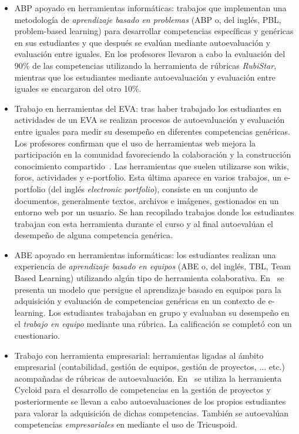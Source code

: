 \begin{itemize}
\item ABP apoyado en herramientas informáticas: trabajos que implementan una metodología de \emph{aprendizaje basado en problemas} (ABP o, del inglés, PBL, problem-based learning) para desarrollar competencias específicas y genéricas en sus estudiantes y que después se evalúan mediante autoevaluación y evaluación entre iguales. En \cite{lasa2013problem} los profesores llevaron a cabo la evaluación del 90\% de las competencias utilizando la herramienta de rúbricas \emph{RubiStar}, mientras que los estudiantes mediante autoevaluación y evaluación entre iguales se encargaron del otro 10\%. 
\item Trabajo en herramientas del EVA:  tras haber trabajado los estudiantes en actividades de un EVA se realizan procesos de autoevaluación y evaluación entre iguales para medir su desempeño en diferentes competencias genéricas. Los profesores confirman que el uso de herramientas web mejora la participación en la comunidad favoreciendo la colaboración y la construcción conocimiento compartido~\cite{starcic2008sustaining}. Las herramientas que suelen utilizarse son wikis, foros, actividades y e-portfolio. Esta última aparece en varios trabajos, un e-portfolio (del inglés \emph{electronic portfolio}), consiste en un conjunto de documentos, generalmente textos, archivos e imágenes, gestionados en un entorno web por un usuario. Se han recopilado trabajos donde los estudiantes trabajan con esta herramienta durante el curso y al final autoevalúan el desempeño de alguna competencia genérica\cite{arno2011promoting}. 
\item ABE apoyado en herramientas informáticas: los estudiantes realizan una experiencia de \emph{aprendizaje basado en equipos} (ABE o, del inglés, TBL, Team Based Learning) utilizando algún tipo de herramienta colaborativa. En~\cite{ficapal2015learning} se presenta un modelo que persigue el aprendizaje basado en equipos para la adquisición y evaluación de competencias genéricas en un contexto de e-learning. Los estudiantes trabajaban en grupo y evaluaban su desempeño en el \emph{trabajo en equipo} mediante una rúbrica. La calificación se completó con un cuestionario.
\item Trabajo con herramienta empresarial: herramientas ligadas al ámbito empresarial (contabilidad, gestión de equipos, gestión de proyectos, ... etc.) acompañadas de rúbricas de autoevaluación.  En~\cite{chang2009international} se utiliza la herramienta Cycloid para el desarrollo de competencias en la gestión de proyectos y posteriormente se llevan a cabo autoevaluaciones de los propios estudiantes para valorar la adquisición de dichas competencias. También se autoevalúan competencias \emph{empresariales} en  \cite{achcaoucaou2014competence} mediante el uso de Tricuspoid. 

\end{itemize}
